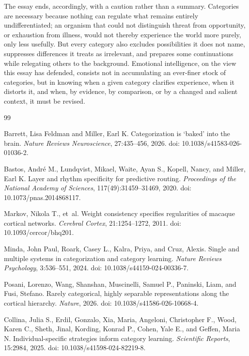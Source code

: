 \documentclass[11pt]{article}
\begin{document}
The essay ends, accordingly, with a caution rather than a summary. Categories are necessary because nothing can regulate what remains entirely undifferentiated; an organism that could not distinguish threat from opportunity, or exhaustion from illness, would not thereby experience the world more purely, only less usefully. But every category also excludes possibilities it does not name, suppresses differences it treats as irrelevant, and prepares some continuations while relegating others to the background. Emotional intelligence, on the view this essay has defended, consists not in accumulating an ever-finer stock of categories, but in knowing when a given category clarifies experience, when it distorts it, and when, by evidence, by comparison, or by a changed and salient context, it must be revised.

\begin{thebibliography}{99}

Barrett, Lisa Feldman and Miller, Earl K.
\newblock Categorization is `baked' into the brain.
\newblock \emph{Nature Reviews Neuroscience}, 27:435--456, 2026.
\newblock doi: 10.1038/s41583-026-01036-2.

Bastos, Andr\'e M., Lundqvist, Mikael, Waite, Ayan S., Kopell, Nancy, and Miller, Earl K.
\newblock Layer and rhythm specificity for predictive routing.
\newblock \emph{Proceedings of the National Academy of Sciences}, 117(49):31459--31469, 2020.
\newblock doi: 10.1073/pnas.2014868117.

Markov, Nikola T., et~al.
\newblock Weight consistency specifies regularities of macaque cortical networks.
\newblock \emph{Cerebral Cortex}, 21:1254--1272, 2011.
\newblock doi: 10.1093/cercor/bhq201.

Minda, John Paul, Roark, Casey L., Kalra, Priya, and Cruz, Alexis.
\newblock Single and multiple systems in categorization and category learning.
\newblock \emph{Nature Reviews Psychology}, 3:536--551, 2024.
\newblock doi: 10.1038/s44159-024-00336-7.

Posani, Lorenzo, Wang, Shanshan, Muscinelli, Samuel P., Paninski, Liam, and Fusi, Stefano.
\newblock Rarely categorical, highly separable representations along the cortical hierarchy.
\newblock \emph{Nature}, 2026.
\newblock doi: 10.1038/s41586-026-10668-4.

Collina, Julia S., Erdil, Gonzalo, Xia, Maria, Angeloni, Christopher F., Wood, Karen C., Sheth, Jinal, Kording, Konrad P., Cohen, Yale E., and Geffen, Maria N.
\newblock Individual-specific strategies inform category learning.
\newblock \emph{Scientific Reports}, 15:2984, 2025.
\newblock doi: 10.1038/s41598-024-82219-8.


\end{thebibliography}
\end{document}
